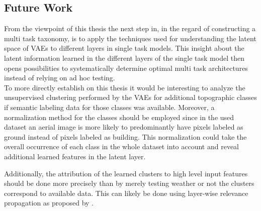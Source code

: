 \subsection{Future Work}

From the viewpoint of this thesis the next step in, in the regard of constructing a multi task taxonomy, is to apply
the techniques used for understanding the latent space of VAEs to different layers in single task models. This insight
about the latent information learned in the different layers of the single task model then opens possibilities
to systematically determine optimal multi task architectures instead of relying on ad hoc testing.\\

To more directly establish on this thesis it would be interesting to analyze the unsupervised clustering performed by
the VAEs for additional topographic classes if semantic labeling data for those classes was available.
Moreover, a normalization method for the classes should be employed since in the used dataset an aerial
image is more likely to predominantly have pixels labeled as ground instead of pixels labeled as building.
This normalization could take the overall occurrence of each class in the whole dataset into account and reveal
additional learned features in the latent layer.

Additionally, the attribution of the learned clusters to high level input features should be done more precisely 
than by merely testing weather or not the clusters correspond to available data. This can likely be done using 
layer-wise relevance propagation as proposed by \textcite{2015-bach-on}.


